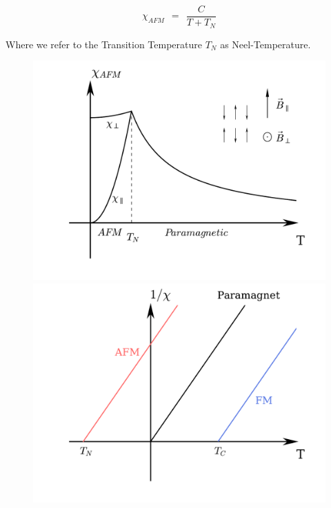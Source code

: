 \documentclass[10pt]{report}
\numberwithin{equation}{chapter}
\begin{document}
\begin{equation}
  \chi_{AFM} ~~=~~ \frac{C}{T+T_N}
\end{equation}

Where we refer to the Transition Temperature $T_N$ as Neel-Temperature.


\begin{figure}[t]
  \begin{minipage}[c][6.00cm]{.5\textwidth}
    \vspace*{\fill}
    \centering
    \includegraphics[width=0.916\linewidth]{../img/antiferro_suscept.pdf}
    \captionsetup{width=.95\linewidth}
  \end{minipage}%
  \begin{minipage}[c][6.00cm]{.5\textwidth}
    \vspace*{\fill}
    \centering
    \includegraphics[width=1.0\linewidth]{../img/antiferro_para_compar.pdf}
    \captionsetup{width=1.0\linewidth}
  \end{minipage}
  \label{fig:2:tests}
\end{figure}
\end{document}
